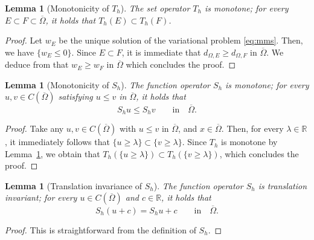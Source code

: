 \documentclass[11pt]{article}
\numberwithin{equation}{section}
\newtheorem{lemma}[theorem]{Lemma}
\newcommand{\R}{\mathbb{R}}
\newcommand{\closure}[1]{\overline{#1}}
\def\leq{\leqslant}
\def\geq{\geqslant}
\begin{document}
\begin{lemma}[Monotonicity of $T_h$]
    \label{lem:Th_monotone}
    The set operator $T_h$ is monotone; for every $E\subset F\subset\closure{\Omega}$, it holds that $T_h(E)\subset T_h(F)$.
\end{lemma}
\begin{proof}
    Let $w_E$ be the unique solution of the variational problem \eqref{eq:mms}.
    Then, we have $\{w_E\leq 0\}$. Since $E\subset F$, it is immediate that $d_{\Omega,E}\geq d_{\Omega,F}$ in $\closure{\Omega}$.
    We deduce from \cite[Lemma 3.1]{EG25} that $w_E\geq w_F$ in $\closure{\Omega}$ which concludes the proof.
\end{proof}

\begin{lemma}[Monotonicity of $S_h$]
    \label{lem:Sh_monotone}
    The function operator $S_h$ is monotone; for every $u,v\in C(\closure{\Omega})$ satisfying $u\leq v$ in $\closure{\Omega}$,
    it holds that $$S_hu\leq S_hv\qquad\mbox{in}\quad\closure{\Omega}.$$
\end{lemma}
\begin{proof}
    Take any $u,v\in C(\closure{\Omega})$ with $u\leq v$ in $\closure{\Omega}$, and $x\in\closure{\Omega}$.
    Then, for every $\lambda\in\R$, it immediately follows that $\{u\geq \lambda\} \subset \{v\geq \lambda\}$.
    Since $T_h$ is monotone by Lemma~\ref{lem:Th_monotone}, we obtain that $T_h(\{u\geq \lambda\})\subset T_h(\{v\geq \lambda\})$,
    which concludes the proof.
\end{proof}

\begin{lemma}[Translation invariance of $S_h$]
    \label{lem:Sh_translation}
    The function operator $S_h$ is translation invariant; for every $u\in C(\closure{\Omega})$ and $c\in\R$, it holds that $$S_h(u + c) = S_hu + c\qquad\mbox{in}\quad\closure{\Omega}.$$
\end{lemma}
\begin{proof}
    This is straightforward from the definition of $S_h$.
\end{proof}
\end{document}

